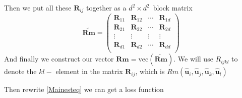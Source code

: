 \documentclass{article}
\begin{document}
Then we put all these $\boldsymbol{R}_{ij}$ together as a $d^2\times d^2 $\ block matrix
\begin{equation}
	\widetilde{\boldsymbol{Rm}}=
	\begin{pmatrix}
	\boldsymbol{R}_{11} & \boldsymbol{R}_{12}&\cdots &\boldsymbol{R}_{1d} \\
	\boldsymbol{R}_{21} & \boldsymbol{R}_{22}&\cdots &\boldsymbol{R}_{2d} \\
	\vdots & \vdots & \vdots & \vdots \\
	\boldsymbol{R}_{d1} & \boldsymbol{R}_{d2}&\cdots& \boldsymbol{R}_{dd} \\
	\end{pmatrix}
\end{equation}
And finally we construct our vector $\boldsymbol{Rm}=\text{vec}(\widetilde{\boldsymbol{Rm}})$. We will use $R_{ijkl}$ to denote the $kl-$ element in the matrix $\boldsymbol{R}_{ij}$, which is $Rm(\widehat{\boldsymbol{u}}_i,\widehat{\boldsymbol{u}}_j,\widehat{\boldsymbol{u}}_k,\widehat{\boldsymbol{u}}_l)$ 
\par
Then rewrite \ref{Mainesteq} we can get a loss function
\end{document}
